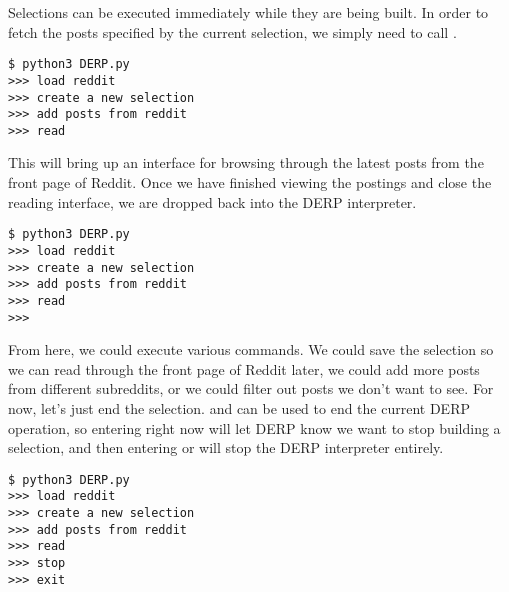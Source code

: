 Selections can be executed immediately while they are being built. In order to fetch the posts specified by the current selection, we simply need to call .
\newline\begin{minipage}{\linewidth}\begin{lstlisting}
$ python3 DERP.py
>>> load reddit
>>> create a new selection
>>> add posts from reddit
>>> read
\end{lstlisting}\end{minipage}



This will bring up an interface for browsing through the latest posts from the front page of Reddit. Once we have finished viewing the postings and close the reading interface, we are dropped back into the DERP interpreter.
\newline\begin{minipage}{\linewidth}\begin{lstlisting}
$ python3 DERP.py
>>> load reddit
>>> create a new selection
>>> add posts from reddit
>>> read
>>>
\end{lstlisting}\end{minipage}


From here, we could execute various commands. We could save the selection so we can read through the front page of Reddit later, we could add more posts from different subreddits, or we could filter out posts we don’t want to see. For now, let’s just end the selection.
 and  can be used to end the current DERP operation, so entering  right now will let DERP know we want to stop building a selection, and then entering  or  will stop the DERP interpreter entirely.
\newline\begin{minipage}{\linewidth}\begin{lstlisting}
$ python3 DERP.py
>>> load reddit
>>> create a new selection
>>> add posts from reddit
>>> read
>>> stop
>>> exit
\end{lstlisting}\end{minipage}

